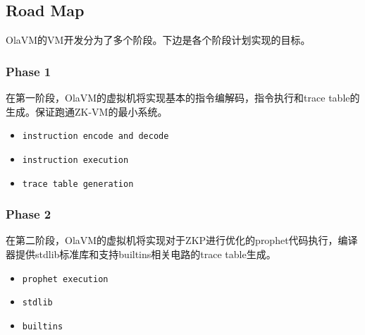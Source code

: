 \subsection{Road Map}\label{subsec: : road-map}
OlaVM的VM开发分为了多个阶段。下边是各个阶段计划实现的目标。
\subsubsection{Phase 1}
在第一阶段，OlaVM的虚拟机将实现基本的指令编解码，指令执行和trace table的生成。保证跑通ZK-VM的最小系统。
\begin{itemize}
    \item \verb|instruction encode and decode|
    \item \verb|instruction execution|
    \item \verb|trace table generation|
\end{itemize}

\subsubsection{Phase 2}
在第二阶段，OlaVM的虚拟机将实现对于ZKP进行优化的prophet代码执行，编译器提供stdlib标准库和支持builtins相关电路的trace table生成。
\begin{itemize}
    \item \verb|prophet execution|
    \item \verb|stdlib|
    \item \verb|builtins|
\end{itemize}

